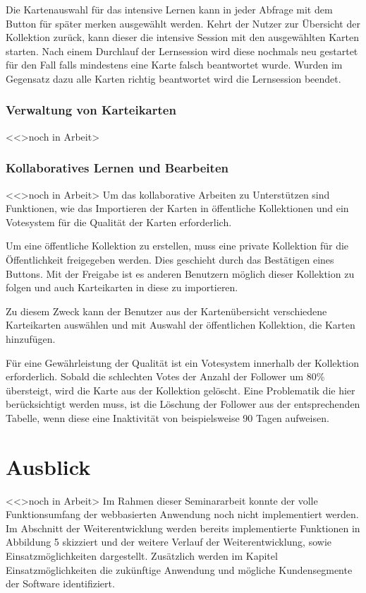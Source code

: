 Die Kartenauswahl für das intensive Lernen kann in jeder Abfrage mit dem Button \glqq für später merken\grqq{}
 ausgewählt werden. Kehrt der Nutzer zur Übersicht der Kollektion zurück, kann dieser die intensive Session mit den ausgewählten Karten starten. Nach einem Durchlauf der Lernsession wird diese nochmals neu gestartet für den Fall falls mindestens eine Karte falsch beantwortet wurde. Wurden im Gegensatz dazu alle Karten richtig beantwortet wird die Lernsession beendet.

\subsubsection{Verwaltung von Karteikarten}
<<>noch in Arbeit>





\subsubsection{Kollaboratives Lernen und Bearbeiten}
<<>noch in Arbeit>
Um das kollaborative Arbeiten zu Unterstützen sind Funktionen, wie das Importieren der Karten in öffentliche Kollektionen und ein Votesystem für die Qualität der Karten erforderlich. 

Um eine öffentliche Kollektion zu erstellen, muss eine private Kollektion für die Öffentlichkeit freigegeben werden. Dies geschieht durch das Bestätigen eines Buttons. Mit der Freigabe ist es anderen Benutzern möglich dieser Kollektion zu folgen und auch Karteikarten in diese zu importieren. 

Zu diesem Zweck kann der Benutzer aus der Kartenübersicht verschiedene Karteikarten auswählen und mit Auswahl der öffentlichen Kollektion, die Karten hinzufügen. 

Für eine Gewährleistung der Qualität ist ein Votesystem innerhalb der Kollektion erforderlich. Sobald die schlechten Votes der Anzahl der Follower um 80{\%} übersteigt, wird die Karte aus der Kollektion gelöscht. Eine Problematik die hier berücksichtigt werden muss, ist die Löschung der Follower aus der entsprechenden Tabelle, wenn diese eine Inaktivität von beispielsweise 90 Tagen aufweisen. 


\section{Ausblick}
<<>noch in Arbeit>
Im Rahmen dieser Seminararbeit konnte der volle Funktionsumfang der webbasierten Anwendung noch nicht implementiert werden. Im Abschnitt der Weiterentwicklung werden bereits implementierte Funktionen in Abbildung 5 skizziert und der weitere Verlauf der Weiterentwicklung, sowie Einsatzmöglichkeiten dargestellt. Zusätzlich werden im Kapitel Einsatzmöglichkeiten die zukünftige Anwendung und mögliche Kundensegmente der Software identifiziert.


